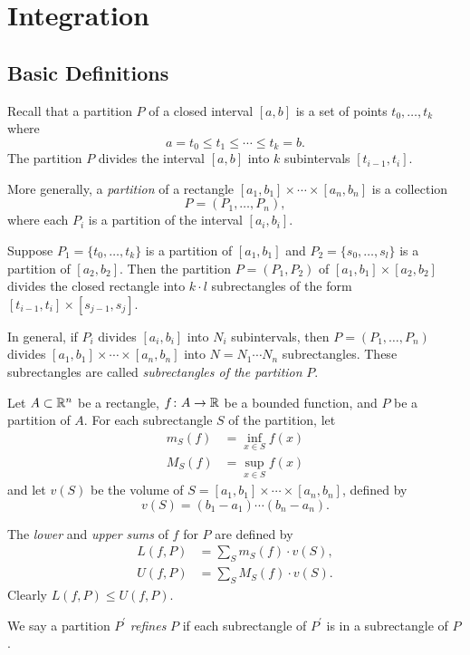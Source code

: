 \chapter{Integration}
\section{Basic Definitions}
Recall that a partition $P$ of a closed interval $[a,b]$ is a set of points $t_0,\dots,t_k$ where
\[a=t_0\le t_1\le\cdots\le t_k=b.\]
The partition $P$ divides the interval $[a,b]$ into $k$ subintervals $[t_{i-1},t_i]$.

More generally, a \emph{partition} of a rectangle $[a_1,b_1]\times\cdots\times[a_n,b_n]$ is a collection
\[P=(P_1,\dots,P_n),\]
where each $P_i$ is a partition of the interval $[a_i,b_i]$. 

\begin{example}
Suppose $P_1=\{t_0,\dots,t_k\}$ is a partition of $[a_1,b_1]$ and $P_2=\{s_0,\dots,s_l\}$ is a partition of $[a_2,b_2]$. Then the partition $P=(P_1,P_2)$ of $[a_1,b_1]\times[a_2,b_2]$ divides the closed rectangle into $k\cdot l$ subrectangles of the form $[t_{i-1},t_i]\times[s_{j-1},s_j]$.
\end{example}

In general, if $P_i$ divides $[a_i,b_i]$ into $N_i$ subintervals, then $P=(P_1,\dots,P_n)$ divides $[a_1,b_1]\times\cdots\times[a_n,b_n]$ into $N=N_1\cdots N_n$ subrectangles. 
These subrectangles are called \emph{subrectangles of the partition} $P$.

Let $A\subset\mathbb R^n$ be a rectangle, $f\colon A\to\mathbb R$ be a bounded function, and $P$ be a partition of $A$. For each subrectangle $S$ of the partition, let
\begin{align*}
m_S(f)&=\inf_{x\in S}f(x)\\
M_S(f)&=\sup_{x\in S}f(x)
\end{align*}
and let $v(S)$ be the volume of $S=[a_1,b_1]\times\cdots\times[a_n,b_n]$, defined by
\[v(S)=(b_1-a_1)\cdots(b_n-a_n).\]

The \emph{lower} and \emph{upper sums} of $f$ for $P$ are defined by
\begin{align*}
L(f,P)&=\sum_{S}m_S(f)\cdot v(S),\\
U(f,P)&=\sum_{S}M_S(f)\cdot v(S).
\end{align*}
Clearly $L(f,P)\le U(f,P)$.

We say a partition $P^\prime$ \emph{refines} $P$ if each subrectangle of $P^\prime$ is in a subrectangle of $P$.

